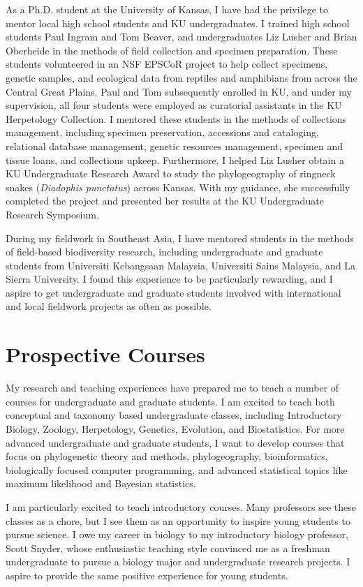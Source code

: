 \documentclass[10pt]{article}
\begin{document}
As a Ph.D. student at the University of Kansas, I have had the privilege to mentor local high school students and KU undergraduates.
I trained high school students Paul Ingram and Tom Beaver, and undergraduates Liz Lusher and Brian Oberheide in the methods of field collection and specimen preparation.
These students volunteered in an NSF EPSCoR project to help collect specimens, genetic samples, and ecological data from reptiles and amphibians from across the Central Great Plains.
Paul and Tom subsequently enrolled in KU, and under my supervision, all four students were employed as curatorial assistants in the KU Herpetology Collection.
I mentored these students in the methods of collections management, including specimen preservation, accessions and cataloging, relational database management, genetic resources management, specimen and tissue loans, and collections upkeep.
Furthermore, I helped Liz Lusher obtain a KU Undergraduate Research Award to study the phylogeography of ringneck snakes (\emph{Diadophis punctatus}) across Kansas.
With my guidance, she successfully completed the project and presented her results at the KU Undergraduate Research Symposium.

During my fieldwork in Southeast Asia, I have mentored students in the methods of field-based biodiversity research, including undergraduate and graduate students from Universiti Kebangsaan Malaysia, Universiti Sains Malaysia, and La Sierra University.
I found this experience to be particularly rewarding, and I aspire to get undergraduate and graduate students involved with international and local fieldwork projects as often as possible.

\section*{Prospective Courses}
My research and teaching experiences have prepared me to teach a number of courses for undergraduate and graduate students.
I am excited to teach both conceptual and taxonomy based undergraduate classes, including Introductory Biology, Zoology, Herpetology, Genetics, Evolution, and Biostatistics.
For more advanced undergraduate and graduate students, I want to develop courses that focus on phylogenetic theory and methods, phylogeography, bioinformatics, biologically focused computer programming, and advanced statistical topics like maximum likelihood and Bayesian statistics.

I am particularly excited to teach introductory courses.
Many professors see these classes as a chore, but I see them as an opportunity to inspire young students to pursue science.
I owe my career in biology to my introductory biology professor, Scott Snyder, whose enthusiastic teaching style convinced me as a freshman undergraduate to pursue a biology major and undergraduate research projects.
I aspire to provide the same positive experience for young students.
\end{document}
